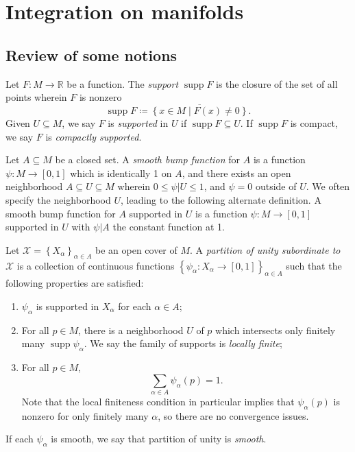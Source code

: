 \chapter{Integration on manifolds}


\section{Review of some notions}

\begin{definition}\label{5.1.1}
	Let $F : M \to \mathbb{R} $ be a function. The \emph{support} $\operatorname{supp} F$ is the closure of the set of all points wherein $F$ is nonzero
	\[
		\operatorname{supp} F \coloneqq \overline{\left\{ x\in M\mid F(x)\neq 0 \right\} } 
	.\]
	Given $U\subseteq M$, we say $F$ is \emph{supported} in $U$ if $\operatorname{supp} F\subseteq U$. If $\operatorname{supp} F$ is compact, we say $F$ is \emph{compactly supported}.
\end{definition}
\begin{definition}\label{5.1.2}
	Let $A\subseteq M$ be a closed set. A \emph{smooth bump function} for $A$ is a function $\psi : M \to [0,1]$ which is identically 1 on $A$, and there exists an open neighborhood $A\subseteq U\subseteq M$ wherein $0 \leq \psi |U \leq 1$, and $\psi =0$ outside of $U$. We often specify the neighborhood $U$, leading to the following alternate definition. A smooth bump function for $A$ supported in $U$ is a function $\psi : M \to [0,1]$ supported in $U$ with $\psi |A$ the constant function at 1.
\end{definition}

\begin{definition}\label{5.1.3}
	Let $\mathcal{X} =\left\{ X_\alpha  \right\} _{\alpha \in A} $ be an open cover of $M$. A \emph{partition of unity subordinate to} $\mathcal{X} $ is a collection of continuous functions $\left\{ \psi _\alpha : X_\alpha  \to [0,1]  \right\} _{\alpha \in A} $ such that the following properties are satisfied:
	\begin{enumerate}
		\item $\psi _\alpha $ is supported in $X_\alpha $ for each $\alpha \in A$;
		\item For all $p\in M$, there is a neighborhood $U$ of $p$ which intersects only finitely many $\operatorname{supp} \psi _\alpha $. We say the family of supports is \emph{locally finite};
		\item For all $p\in M$,
			\[
				\sum_{\alpha \in A} \psi _\alpha (p)=1
			.\]
			Note that the local finiteness condition in particular implies that $\psi _\alpha (p)$ is nonzero for only finitely many $\alpha $, so there are no convergence issues.
	\end{enumerate}
	If each $\psi _\alpha $ is smooth, we say that partition of unity is \emph{smooth}.
\end{definition}

